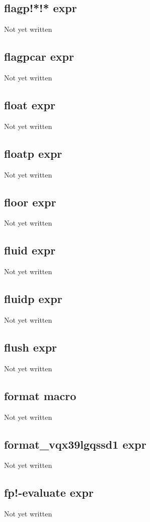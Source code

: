 \documentclass[a4paper,11pt]{article}
\begin{document}
\subsection{\ttfamily flagp!*!* expr}
Not yet written

\subsection{\ttfamily flagpcar expr}
Not yet written

\subsection{\ttfamily float expr}
Not yet written

\subsection{\ttfamily floatp expr}
Not yet written

\subsection{\ttfamily floor expr}
Not yet written

\subsection{\ttfamily fluid expr}
Not yet written

\subsection{\ttfamily fluidp expr}
Not yet written

\subsection{\ttfamily flush expr}
Not yet written

\subsection{\ttfamily format macro}
Not yet written

\subsection{\ttfamily format\_vqx39lgqssd1 expr}
Not yet written

\subsection{\ttfamily fp!-evaluate expr}
Not yet written
\end{document}
